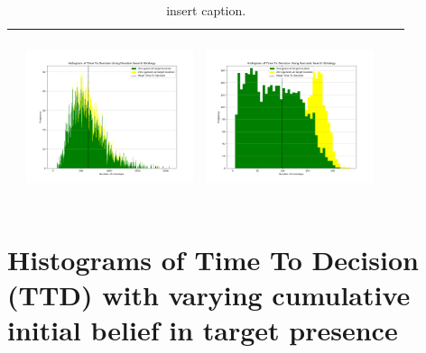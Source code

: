 \begin{landscape}
\begin{table}[h!]
\begin{tabular}{ | c | c | c | c | c |}
\begin{minipage}[c][49mm][c]{49mm}
    \end{minipage}
    &
    \begin{minipage}[c][49mm][c]{49mm}
      \includegraphics[width=49mm, height=49mm]{Chapters/MultiAgentTargetDetection/Figs/Histograms/VaryingPrior/Uniform/UniformRandomHistogram.png}
    \end{minipage}
    &
    \begin{minipage}[c][49mm][c]{49mm}
      \includegraphics[width=49mm, height=49mm]{Chapters/MultiAgentTargetDetection/Figs/Histograms/VaryingPrior/Uniform/UniformSaccadicHistogram.png}
    \end{minipage}
    \\
    \hline
   
  \end{tabular}
  \caption{insert caption. }\label{table:ORToolsResults}
\end{table}

\break


\vspace*{\fill}
\section{Histograms of Time To Decision (TTD) with varying cumulative initial belief in target presence}


\end{landscape}
